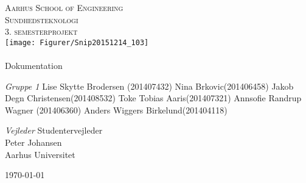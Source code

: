 \begin{titlingpage}
\begin{center}


\textsc{\LARGE Aarhus School of Engineering}\\[1cm]

\textsc{\Large Sundhedsteknologi}\\
\textsc{\Large 3. semesterprojekt}\\[1cm]

\texttt{[image: Figurer/Snip20151214\_103]}\\[1cm]

\noindent\makebox[\linewidth]{\rule{\textwidth}{0.4pt}}\\
[0.5cm]{\Huge Dokumentation}
\noindent\makebox[\linewidth]{\rule{\textwidth}{0.4pt}}

\end{center}

\textit{Gruppe 1} \newline
Lise Skytte Brodersen (201407432) \newline
Nina Brkovic(201406458) \newline
Jakob Degn Christensen(201408532) \newline
Toke Tobias Aaris(201407321) \newline		 
Annsofie Randrup Wagner (201406360) \newline 
Anders Wiggers Birkelund(201404118) \newline



\textit{Vejleder} \newline
Studentervejleder\\
Peter Johansen\\
Aarhus Universitet


\vfill

\begin{center}
{\large \today}
\end{center}


\end{titlingpage}